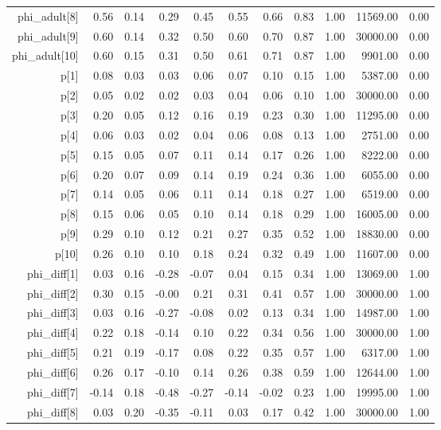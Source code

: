 \begin{table}[ht]
\begin{tabular}{rrrrrrrrrrr}
  phi\_adult[8] & 0.56 & 0.14 & 0.29 & 0.45 & 0.55 & 0.66 & 0.83 & 1.00 & 11569.00 & 0.00 \\ 
  phi\_adult[9] & 0.60 & 0.14 & 0.32 & 0.50 & 0.60 & 0.70 & 0.87 & 1.00 & 30000.00 & 0.00 \\ 
  phi\_adult[10] & 0.60 & 0.15 & 0.31 & 0.50 & 0.61 & 0.71 & 0.87 & 1.00 & 9901.00 & 0.00 \\ 
  p[1] & 0.08 & 0.03 & 0.03 & 0.06 & 0.07 & 0.10 & 0.15 & 1.00 & 5387.00 & 0.00 \\ 
  p[2] & 0.05 & 0.02 & 0.02 & 0.03 & 0.04 & 0.06 & 0.10 & 1.00 & 30000.00 & 0.00 \\ 
  p[3] & 0.20 & 0.05 & 0.12 & 0.16 & 0.19 & 0.23 & 0.30 & 1.00 & 11295.00 & 0.00 \\ 
  p[4] & 0.06 & 0.03 & 0.02 & 0.04 & 0.06 & 0.08 & 0.13 & 1.00 & 2751.00 & 0.00 \\ 
  p[5] & 0.15 & 0.05 & 0.07 & 0.11 & 0.14 & 0.17 & 0.26 & 1.00 & 8222.00 & 0.00 \\ 
  p[6] & 0.20 & 0.07 & 0.09 & 0.14 & 0.19 & 0.24 & 0.36 & 1.00 & 6055.00 & 0.00 \\ 
  p[7] & 0.14 & 0.05 & 0.06 & 0.11 & 0.14 & 0.18 & 0.27 & 1.00 & 6519.00 & 0.00 \\ 
  p[8] & 0.15 & 0.06 & 0.05 & 0.10 & 0.14 & 0.18 & 0.29 & 1.00 & 16005.00 & 0.00 \\ 
  p[9] & 0.29 & 0.10 & 0.12 & 0.21 & 0.27 & 0.35 & 0.52 & 1.00 & 18830.00 & 0.00 \\ 
  p[10] & 0.26 & 0.10 & 0.10 & 0.18 & 0.24 & 0.32 & 0.49 & 1.00 & 11607.00 & 0.00 \\ 
  phi\_diff[1] & 0.03 & 0.16 & -0.28 & -0.07 & 0.04 & 0.15 & 0.34 & 1.00 & 13069.00 & 1.00 \\ 
  phi\_diff[2] & 0.30 & 0.15 & -0.00 & 0.21 & 0.31 & 0.41 & 0.57 & 1.00 & 30000.00 & 1.00 \\ 
  phi\_diff[3] & 0.03 & 0.16 & -0.27 & -0.08 & 0.02 & 0.13 & 0.34 & 1.00 & 14987.00 & 1.00 \\ 
  phi\_diff[4] & 0.22 & 0.18 & -0.14 & 0.10 & 0.22 & 0.34 & 0.56 & 1.00 & 30000.00 & 1.00 \\ 
  phi\_diff[5] & 0.21 & 0.19 & -0.17 & 0.08 & 0.22 & 0.35 & 0.57 & 1.00 & 6317.00 & 1.00 \\ 
  phi\_diff[6] & 0.26 & 0.17 & -0.10 & 0.14 & 0.26 & 0.38 & 0.59 & 1.00 & 12644.00 & 1.00 \\ 
  phi\_diff[7] & -0.14 & 0.18 & -0.48 & -0.27 & -0.14 & -0.02 & 0.23 & 1.00 & 19995.00 & 1.00 \\ 
  phi\_diff[8] & 0.03 & 0.20 & -0.35 & -0.11 & 0.03 & 0.17 & 0.42 & 1.00 & 30000.00 & 1.00 \\ 

\end{tabular}
\end{table}
